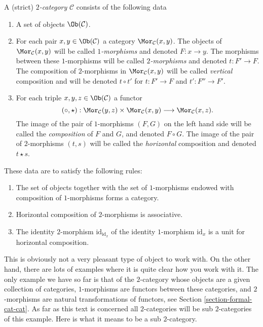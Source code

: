 \begin{definition}
\label{definition-2-category}
A (strict) {\it $2$-category} $\mathcal{C}$ consists of the following data
\begin{enumerate}
\item A set of objects $\Ob(\mathcal{C})$.
\item For each pair $x, y \in \Ob(\mathcal{C})$
a category $\Mor_\mathcal{C}(x, y)$. The objects of
$\Mor_\mathcal{C}(x, y)$ will be called {\it $1$-morphisms}
and denoted $F : x \to y$. The morphisms between these $1$-morphisms
will be called {\it $2$-morphisms} and denoted $t : F' \to F$.
The composition of $2$-morphisms in $\Mor_\mathcal{C}(x, y)$
will be called {\it vertical} composition and will be
denoted $t \circ t'$ for $t : F' \to F$ and $t' : F'' \to F'$.
\item For each triple $x, y, z\in \Ob(\mathcal{C})$ a
functor
$$
(\circ, \star) :
\Mor_\mathcal{C}(y, z) \times \Mor_\mathcal{C}(x, y)
\longrightarrow
\Mor_\mathcal{C}(x, z).
$$
The image of the pair of $1$-morphisms $(F, G)$ on the left hand side
will be called the {\it composition} of $F$ and $G$, and denoted
$F\circ G$. The image of the pair of $2$-morphisms $(t, s)$ will
be called the {\it horizontal} composition and denoted $t \star s$.
\end{enumerate}
These data are to satisfy the following rules:
\begin{enumerate}
\item The set of objects together with the set of $1$-morphisms endowed
with composition of $1$-morphisms forms a category.
\item Horizontal composition of $2$-morphisms is associative.
\item The identity $2$-morphism $\text{id}_{\text{id}_x}$
of the identity $1$-morphism $\text{id}_x$ is a unit for
horizontal composition.
\end{enumerate}
\end{definition}

\noindent
This is obviously not a very pleasant type of object to work with.
On the other hand, there are lots of examples where it is quite clear
how you work with it. The only example we have so far is that of
the $2$-category whose objects are a given collection of categories,
$1$-morphisms are functors between these categories,
and $2$-morphisms are natural transformations of functors, see
Section \ref{section-formal-cat-cat}.
As far as this text is concerned all $2$-categories will be
sub $2$-categories of this example. Here is what it means to be
a sub $2$-category.

